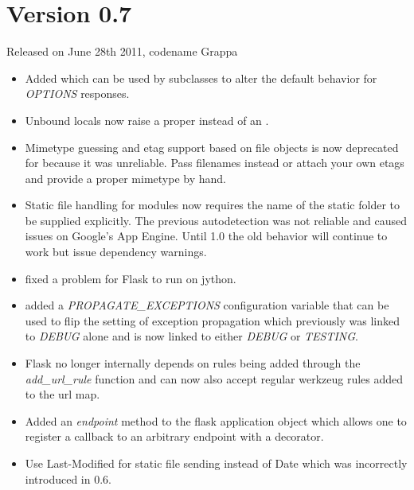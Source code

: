 \documentclass[a4paper,12pt]{sphinxmanual}
\begin{document}
\section{Version 0.7}
\label{changelog:version-0-7}
Released on June 28th 2011, codename Grappa
\begin{itemize}
\item {} 
Added {\hyperref[api:flask.Flask.make_default_options_response]{}}
which can be used by subclasses to alter the default
behavior for \emph{OPTIONS} responses.

\item {} 
Unbound locals now raise a proper \href{http://docs.python.org/dev/library/exceptions.html\#RuntimeError}{} instead
of an \href{http://docs.python.org/dev/library/exceptions.html\#AttributeError}{}.

\item {} 
Mimetype guessing and etag support based on file objects is now
deprecated for {\hyperref[api:flask.send_file]{}} because it was unreliable.
Pass filenames instead or attach your own etags and provide a
proper mimetype by hand.

\item {} 
Static file handling for modules now requires the name of the
static folder to be supplied explicitly.  The previous autodetection
was not reliable and caused issues on Google's App Engine.  Until
1.0 the old behavior will continue to work but issue dependency
warnings.

\item {} 
fixed a problem for Flask to run on jython.

\item {} 
added a \emph{PROPAGATE\_EXCEPTIONS} configuration variable that can be
used to flip the setting of exception propagation which previously
was linked to \emph{DEBUG} alone and is now linked to either \emph{DEBUG} or
\emph{TESTING}.

\item {} 
Flask no longer internally depends on rules being added through the
\emph{add\_url\_rule} function and can now also accept regular werkzeug
rules added to the url map.

\item {} 
Added an \emph{endpoint} method to the flask application object which
allows one to register a callback to an arbitrary endpoint with
a decorator.

\item {} 
Use Last-Modified for static file sending instead of Date which
was incorrectly introduced in 0.6.


\end{itemize}
\end{document}
